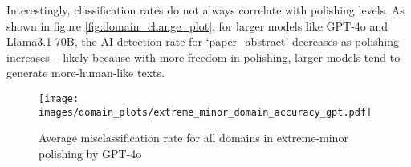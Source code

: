 Interestingly, classification rates do not always correlate with polishing levels. As shown in figure \ref{fig:domain_change_plot}, for larger models like GPT-4o and Llama3.1-70B, the AI-detection rate for `paper\_abstract' decreases as polishing increases -- likely because with more freedom in polishing, larger models tend to generate more-human-like texts. 


\begin{figure}
    \centering
    \texttt{[image: images/domain\_plots/extreme\_minor\_domain\_accuracy\_gpt.pdf]}
    \caption{Average misclassification rate for all domains in extreme-minor polishing by GPT-4o}
    \label{fig:domain_ext_minor_gpt}
\end{figure}

\iffalse
\subsection{Commercial Detectors are no better in the case of AI-polished texts.}
\smk{Need to plot other polisher lines in one plot.}
\smk{Write after running GPTZero.}
\fi
